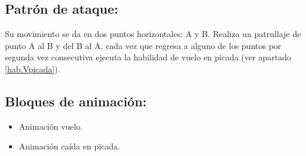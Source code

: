 \subsection{Patrón de ataque:}
Su movimiento se da en dos puntos horizontales: A y B. Realiza un patrullaje de punto A al B y del B al A, cada vez que regresa a alguno de los puntos por segunda vez consecutiva ejecuta la habilidad de vuelo en picada (ver apartado \ref{hab.Vpicada}).
\subsection{Bloques de animación:}
	\begin{itemize}
		\item Animación vuelo.
		\item Animación caída en picada.
	\end{itemize}